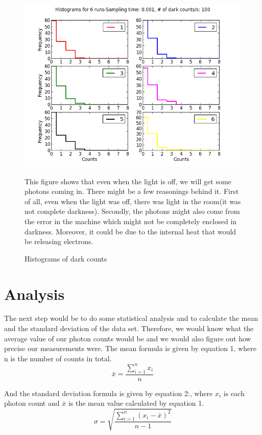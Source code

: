 \documentclass[letterpaper,12pt]{article}
\begin{document}
\begin{figure}[t]
\centering
\includegraphics[scale=0.7]{Darkcounts1.png}
\caption{Histograms of dark counts}
This figure shows that even when the light is off, we will get some photons coming in. There might be a few reasonings behind it. First of all, even when the light was off, there was light in the room(it was not complete darkness). Secondly, the photons might also come from the error in the machine which might not be completely enclosed in darkness. Moreover, it could be due to the internal heat that would be releasing electrons.
\end{figure}

\section{Analysis}
\label{sec:analysis}
The next step would be to do some statistical analysis and to calculate the mean and the standard deviation of the data set. Therefore, we would know what the average value of our photon counts would be and we would also figure out how precise our measurements were.
The mean formula is given by equation 1, where n is the number of counts in total.
\begin{equation} \label{E:mean}
\bar{x} = \frac{\sum_{i=1}^{n}x_{i}} {n}
\end{equation}


And the standard deviation formula is given by equation 2:, where \begin{math}x_i \end{math} is each photon count and \begin{math} \bar{x} \end{math} is the mean value calculated by equation 1. 
\begin{equation} \label{E:sd}
\sigma = \sqrt{\frac{\sum\limits_{i=1}^{n}
\left(x_{i} - \bar{x}\right)^{2}}
{n-1}}
\end{equation}
\end{document}
